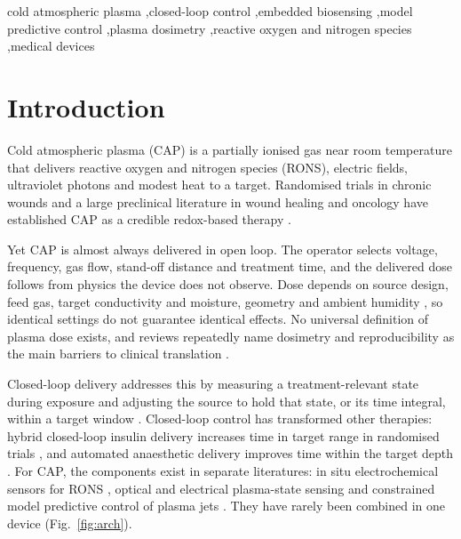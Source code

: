 \documentclass[preprint,review,12pt,authoryear]{elsarticle}
\begin{document}
\begin{frontmatter}
\begin{keyword}
cold atmospheric plasma \sep closed-loop control \sep embedded biosensing \sep model predictive control \sep plasma dosimetry \sep reactive oxygen and nitrogen species \sep medical devices
\end{keyword}

\end{frontmatter}

\section{Introduction}
\label{sec:intro}

Cold atmospheric plasma (CAP) is a partially ionised gas near room temperature that delivers reactive oxygen and nitrogen species (RONS), electric fields, ultraviolet photons and modest heat to a target. Randomised trials in chronic wounds \citep{isbary2010,brehmer2015,strohal2022} and a large preclinical literature in wound healing and oncology \citep{schmidt2019,he2020,dubuc2018} have established CAP as a credible redox-based therapy \citep{vonwoedtke2019,laroussi2020}.

Yet CAP is almost always delivered in open loop. The operator selects voltage, frequency, gas flow, stand-off distance and treatment time, and the delivered dose follows from physics the device does not observe. Dose depends on source design, feed gas, target conductivity and moisture, geometry and ambient humidity \citep{dai2020,miebach2022}, so identical settings do not guarantee identical effects. No universal definition of plasma dose exists, and reviews repeatedly name dosimetry and reproducibility as the main barriers to clinical translation \citep{dai2020,boehm2018}.

Closed-loop delivery addresses this by measuring a treatment-relevant state during exposure and adjusting the source to hold that state, or its time integral, within a target window \citep{bonzanini2022}. Closed-loop control has transformed other therapies: hybrid closed-loop insulin delivery increases time in target range in randomised trials \citep{ware2022}, and automated anaesthetic delivery improves time within the target depth \citep{felippe2026}. For CAP, the components exist in separate literatures: in situ electrochemical sensors for RONS \citep{nasri2021,thomas2026a}, optical and electrical plasma-state sensing \citep{chan2025} and constrained model predictive control of plasma jets \citep{gidon2017}. They have rarely been combined in one device (Fig.~\ref{fig:arch}).
\end{document}
